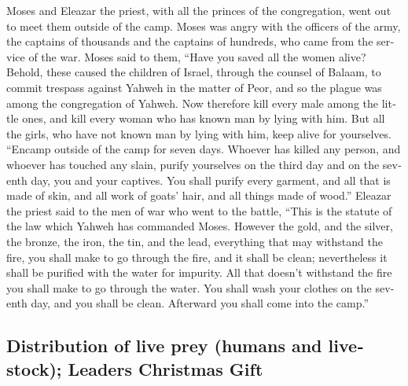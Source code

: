 \begin{paracol}{2}
\begin{otherlanguage}{english}
 Moses and Eleazar the priest, with all the princes of
the congregation, went out to meet them outside of the camp.
 Moses was angry with the officers of the army, the
captains of thousands and the captains of hundreds, who came from the
service of the war.  Moses said to them, ``Have you saved
all the women alive?  Behold, these caused the children
of Israel, through the counsel of Balaam, to commit trespass against
Yahweh in the matter of Peor, and so the plague was among the
congregation of Yahweh.  Now therefore kill every male
among the little ones, and kill every woman who has known man by lying
with him.  But all the girls, who have not known man by
lying with him, keep alive for yourselves.  ``Encamp
outside of the camp for seven days. Whoever has killed any person, and
whoever has touched any slain, purify yourselves on the third day and on
the seventh day, you and your captives.  You shall purify
every garment, and all that is made of skin, and all work of goats'
hair, and all things made of wood.''  Eleazar the priest
said to the men of war who went to the battle, ``This is the statute of
the law which Yahweh has commanded Moses.  However the
gold, and the silver, the bronze, the iron, the tin, and the lead,
 everything that may withstand the fire, you shall make
to go through the fire, and it shall be clean; nevertheless it shall be
purified with the water for impurity. All that doesn't withstand the
fire you shall make to go through the water.  You shall
wash your clothes on the seventh day, and you shall be clean. Afterward
you shall come into the camp.''

\hypertarget{distribution-of-live-prey-humans-and-livestock-leaders-christmas-gift}{%
\subsection{Distribution of live prey (humans and livestock); Leaders
Christmas
Gift}\label{distribution-of-live-prey-humans-and-livestock-leaders-christmas-gift}}


\end{otherlanguage}
\end{paracol}
